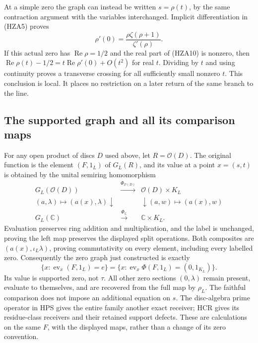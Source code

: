 At a simple zero the graph can instead be written $s=\rho(t)$,
by the same contraction argument with the variables interchanged.
Implicit differentiation in (HZA5) proves
\begin{equation}\tag{HZA10}
 \rho'(0)=\frac{\rho\zeta(\rho+1)}{\zeta'(\rho)}.
\end{equation}
If this actual zero has $\operatorname{Re}\rho=1/2$ and the real
part of (HZA10) is nonzero, then
$\operatorname{Re}\rho(t)-1/2=t\operatorname{Re}\rho'(0)+O(t^2)$
for real $t$. Dividing by $t$ and using continuity proves a
transverse crossing for all sufficiently small nonzero $t$.
This conclusion is local. It places no restriction on a later
return of the same branch to the line.

\subsection{The supported graph and all its comparison maps}

For any open product of discs $D$ used above, let $R=\mathcal O(D)$.
The original function is the element $(F,1_L)$ of $G_L(R)$, and
its value at a point $x=(s,t)$ is obtained by the unital semiring
homomorphism
\begin{equation}\tag{HZA11}
\begin{array}{ccc}
 G_L(\mathcal O(D))&\xrightarrow{\Phi_{\mathcal O(D)}}&
                 \mathcal O(D)\times K_L\\
 {\scriptstyle(a,\lambda)\mapsto(a(x),\lambda)}\downarrow&&
       \downarrow{\scriptstyle(a,w)\mapsto(a(x),w)}\\
 G_L(\mathbb C)&\xrightarrow{\Phi_{\mathbb C}}&\mathbb C\times K_L.
\end{array}
\end{equation}
Evaluation preserves ring addition and multiplication, and the label
is unchanged, proving the left map preserves the displayed split
operations. Both composites are $(a(x),\iota_L\lambda)$, proving
commutativity on every element, including every labelled zero.
Consequently the zero graph just constructed is exactly
\begin{equation}\tag{HZA12}
 \{x:\operatorname{ev}_x(F,1_L)=e\}
 =\{x:\operatorname{ev}_x\Phi(F,1_L)=(0,1_{K_L})\}.
\end{equation}
Its value is supported zero, not $\tau$. All other zero sections
$(0,\lambda)$ remain present, evaluate to themselves, and are
recovered from the full map by $\rho_L$. The faithful comparison
does not impose an additional equation on $s$. The disc-algebra
prime operator in HPS gives the entire family another exact receiver;
HCR gives its residue-class receivers and their retained support
defects. These are calculations on the same $F$, with the displayed
maps, rather than a change of its zero convention.

